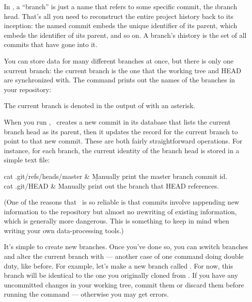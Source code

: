 \documentclass[letterpaper, 12pt, titlepage, twoside]{article}
\begin{document}
In \git, a ``branch'' is just a name that refers to some specific commit, the
\i{branch head}. That's all you need to reconstruct the entire project history
back to its inception: the named commit embeds the unique identifier of its
parent, which embeds the identifier of \i{its} parent, and so on. A branch's
\i{history} is the set of all commits that have gone into it.

You can store data for many different branches at once, but there is only one
\i{current branch}: the current branch is the one that the working tree and
HEAD are synchronized with. The  command prints out the names of
the branches in your repository:


The current branch is denoted in the output of  with an asterisk.


When you run , \git\ creates a new commit in its database that
lists the current branch head as its parent, then it updates the record for
the current branch to point to that new commit. These are both fairly
straightforward operations. For instance, for each branch, the current
identity of the branch head is stored in a simple text file:

\begin{typeme}
cat .git/refs/heads/master & \b{Manually print the master branch commit id.} \\
cat .git/HEAD & Manually print out the branch that HEAD references.
\end{typeme}

(One of the reasons that \git\ is so reliable is that commits involve
\i{appending} new information to the repository but almost no \i{rewriting} of
existing information, which is generally more dangerous. This is something to
keep in mind when writing your own data-processing tools.)

It's simple to create new branches. Once you've done so, you can \i{switch
  branches} and alter the current branch with  --- another case
of one command doing double duty, like  before. For example, let's
make a new branch called . For now, this branch will be
identical to the one you originally cloned from \github. If you have any
uncommitted changes in your working tree, commit them or discard them before
running the  command --- otherwise you may get errors.
\end{document}
